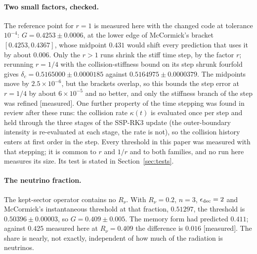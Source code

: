 \documentclass[11pt]{article}
\newcommand{\grade}[1]{\textsf{\small[#1]}}
\begin{document}
\paragraph{Two small factors, checked.} The reference point for $r=1$ is measured here with the changed code at tolerance $10^{-4}$: $G=0.4253\pm0.0006$, at the lower edge of McCormick's bracket $[0.4253,0.4367]$, whose midpoint $0.431$ would shift every prediction that uses it by about $0.006$. Only the $r>1$ runs shrink the stiff time step, by the factor $r$; rerunning $r=1/4$ with the collision-stiffness bound on its step shrunk fourfold gives $\delta_c=0.5165000\pm0.0000185$ against $0.5164975\pm0.0000379$. The midpoints move by $2.5\times10^{-6}$, but the brackets overlap, so this bounds the step error at $r=1/4$ by about $6\times10^{-5}$ and no better, and only the stiffness branch of the step was refined \grade{measured}. One further property of the time stepping was found in review after these runs: the collision rate $\kappa(t)$ is evaluated once per step and held through the three stages of the SSP-RK3 update (the outer-boundary intensity is re-evaluated at each stage, the rate is not), so the collision history enters at first order in the step. Every threshold in this paper was measured with that stepping; it is common to $r$ and $1/r$ and to both families, and no run here measures its size. Its test is stated in Section~\ref{sec:tests}.

\paragraph{The neutrino fraction.} The kept-sector operator contains no $R_\nu$. With $R_\nu=0.2$, $n=3$, $\epsilon_{\rm dec}=2$ and McCormick's instantaneous threshold at that fraction, $0.51297$, the threshold is $0.50396\pm0.00003$, so $G=0.409\pm0.005$. The memory form had predicted $0.411$; against $0.425$ measured here at $R_\nu=0.409$ the difference is $0.016$ \grade{measured}. The share is nearly, not exactly, independent of how much of the radiation is neutrinos.
\end{document}
